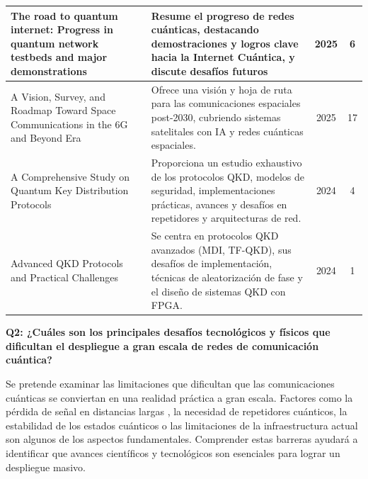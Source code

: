 \begin{longtable}{@{} p{4.5cm} p{6.5cm} c c @{}}
\hline
The road to quantum internet: Progress in quantum network testbeds and major demonstrations~\cite{LIU2025} & Resume el progreso de redes cuánticas, destacando demostraciones y logros clave hacia la Internet Cuántica, y discute desafíos futuros & 2025 & 6 \\
\hline
A Vision, Survey, and Roadmap Toward Space Communications in the 6G and Beyond Era~\cite{Ntontin2024} & Ofrece una visión y hoja de ruta para las comunicaciones espaciales post-2030, cubriendo sistemas satelitales con IA y redes cuánticas espaciales. & 2025 & 17 \\
\hline
A Comprehensive Study on Quantum Key Distribution Protocols~\cite{Mummadi2024} & Proporciona un estudio exhaustivo de los protocolos QKD, modelos de seguridad, implementaciones prácticas, avances y desafíos en repetidores y arquitecturas de red. & 2024 & 4 \\
\hline
Advanced QKD Protocols and Practical Challenges~\cite{Rajpurohit2024} & Se centra en protocolos QKD avanzados (MDI, TF-QKD), sus desafíos de implementación, técnicas de aleatorización de fase y el diseño de sistemas QKD con FPGA. & 2024 & 1 \\
\end{longtable}

\vspace{1em} \textbf {Q2: ¿Cuáles son los principales desafíos tecnológicos y físicos que dificultan el despliegue a gran escala de redes de comunicación cuántica?}

Se pretende examinar las limitaciones que dificultan que las comunicaciones cuánticas se conviertan en una realidad práctica a gran escala. Factores como la pérdida de señal en distancias largas , la necesidad de repetidores cuánticos, la estabilidad de los estados cuánticos o las limitaciones de la infraestructura actual son algunos de los aspectos fundamentales. Comprender estas barreras ayudará a identificar que avances científicos y tecnológicos son esenciales para lograr un despliegue masivo.

